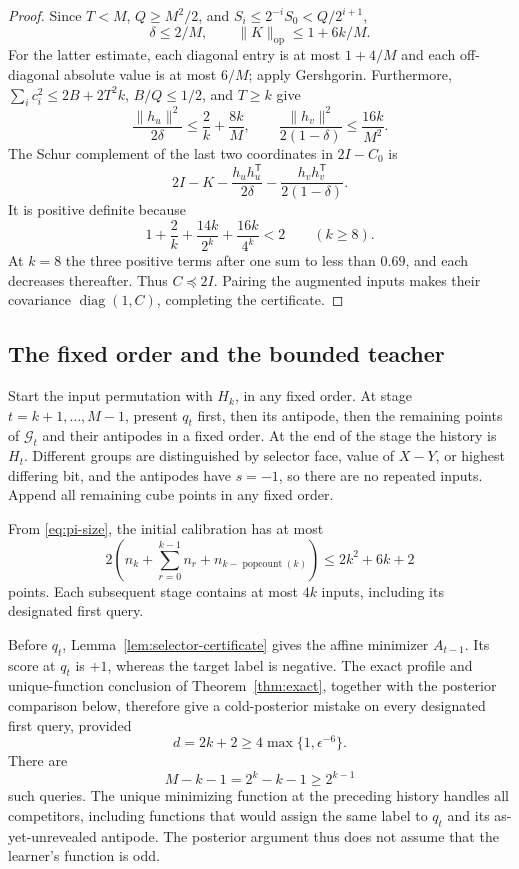 \begin{proof}
Since $T<M$, $Q\ge M^2/2$, and $S_i\le2^{-i}S_0<Q/2^{i+1}$,
\[
 \delta\le2/M,\qquad \|K\|_{\mathrm{op}}\le1+6k/M.
\]
For the latter estimate, each diagonal entry is at most $1+4/M$ and
each off-diagonal absolute value is at most $6/M$; apply Gershgorin.
Furthermore, $\sum_i c_i^2\le2B+2T^2k$, $B/Q\le1/2$, and $T\ge k$
give
\[
 \frac{\|h_u\|^2}{2\delta}\le\frac2k+\frac{8k}{M},\qquad
 \frac{\|h_v\|^2}{2(1-\delta)}\le\frac{16k}{M^2}.
\]
The Schur complement of the last two coordinates in $2I-C_0$ is
\[
 2I-K-\frac{h_uh_u^{\mathsf T}}{2\delta}
       -\frac{h_vh_v^{\mathsf T}}{2(1-\delta)}.
\]
It is positive definite because
\begin{equation}\label{eq:selector-schur-bound}
 1+\frac2k+\frac{14k}{2^k}+\frac{16k}{4^k}<2
 \qquad(k\ge8).
\end{equation}
At $k=8$ the three positive terms after one sum to less than $0.69$,
and each decreases thereafter. Thus $C\preceq2I$. Pairing the augmented
inputs makes their covariance $\operatorname{diag}(1,C)$, completing
the certificate.
\end{proof}

\subsection{The fixed order and the bounded teacher}

Start the input permutation with $H_k$, in any fixed order. At stage
$t=k+1,\ldots,M-1$, present $q_t$ first, then its antipode, then the
remaining points of $\mathcal G_t$ and their antipodes in a fixed order.
At the end of the stage the history is $H_t$. Different groups are
distinguished by selector face, value of $X-Y$, or highest differing bit,
and the
antipodes have $s=-1$, so there are no repeated inputs. Append all
remaining cube points in any fixed order.

From \eqref{eq:pi-size}, the initial calibration has at most
\begin{equation}\label{eq:calibration-count}
 2\left(n_k+\sum_{r=0}^{k-1}n_r+
               n_{k-\operatorname{popcount}(k)}\right)
 \le2k^2+6k+2
\end{equation}
points. Each subsequent stage contains at most $4k$ inputs, including
its designated first query.

Before $q_t$, Lemma~\ref{lem:selector-certificate} gives the affine
minimizer $A_{t-1}$. Its score at $q_t$ is $+1$, whereas the target label
is negative. The exact profile and unique-function conclusion of
Theorem~\ref{thm:exact}, together with the posterior comparison below,
therefore give a cold-posterior mistake on every designated
first query, provided
\[
 d=2k+2\ge4\max\{1,\epsilon^{-6}\}.
\]
There are
\begin{equation}\label{eq:forced-error-count}
 M-k-1=2^k-k-1\ge2^{k-1}
\end{equation}
such queries. The unique minimizing function at the preceding history
handles all competitors, including functions that would assign the
same label to $q_t$ and its as-yet-unrevealed antipode. The posterior
argument thus does not assume that the learner's function is odd.

